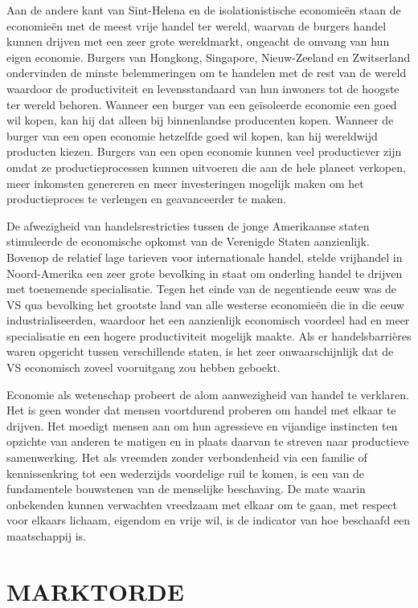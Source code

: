 \documentclass[
  a5paper,
  smalldemyvopaper,11pt,twoside,onecolumn,openright,extrafontsizes,
hidelinks]{memoir}
\begin{document}
Aan de andere kant van Sint-Helena en de isolationistische economieën
staan de economieën met de meest vrije handel ter wereld, waarvan de
burgers handel kunnen drijven met een zeer grote wereldmarkt, ongeacht
de omvang van hun eigen economie. Burgers van Hongkong, Singapore,
Nieuw-Zeeland en Zwitserland ondervinden de minste belemmeringen om te
handelen met de rest van de wereld waardoor de productiviteit en
levensstandaard van hun inwoners tot de hoogste ter wereld behoren.
Wanneer een burger van een geïsoleerde economie een goed wil kopen, kan
hij dat alleen bij binnenlandse producenten kopen. Wanneer de burger van
een open economie hetzelfde goed wil kopen, kan hij wereldwijd producten
kiezen. Burgers van een open economie kunnen veel productiever zijn
omdat ze productieprocessen kunnen uitvoeren die aan de hele planeet
verkopen, meer inkomsten genereren en meer investeringen mogelijk maken
om het productieproces te verlengen en geavanceerder te maken.

De afwezigheid van handelsrestricties tussen de jonge Amerikaanse staten
stimuleerde de economische opkomst van de Verenigde Staten aanzienlijk.
Bovenop de relatief lage tarieven voor internationale handel, stelde
vrijhandel in Noord-Amerika een zeer grote bevolking in staat om
onderling handel te drijven met toenemende specialisatie. Tegen het
einde van de negentiende eeuw was de VS qua bevolking het grootste land
van alle westerse economieën die in die eeuw industrialiseerden,
waardoor het een aanzienlijk economisch voordeel had en meer
specialisatie en een hogere productiviteit mogelijk maakte. Als er
handelsbarrières waren opgericht tussen verschillende staten, is het
zeer onwaarschijnlijk dat de VS economisch zoveel vooruitgang zou hebben
geboekt.

Economie als wetenschap probeert de alom aanwezigheid van handel te
verklaren. Het is geen wonder dat mensen voortdurend proberen om handel
met elkaar te drijven. Het moedigt mensen aan om hun agressieve en
vijandige instincten ten opzichte van anderen te matigen en in plaats
daarvan te streven naar productieve samenwerking. Het als vreemden
zonder verbondenheid via een familie of kennissenkring tot een
wederzijds voordelige ruil te komen, is een van de fundamentele
bouwstenen van de menselijke beschaving. De mate waarin onbekenden
kunnen verwachten vreedzaam met elkaar om te gaan, met respect voor
elkaars lichaam, eigendom en vrije wil, is de indicator van hoe
beschaafd een maatschappij is.

\part{MARKTORDE}
\end{document}
